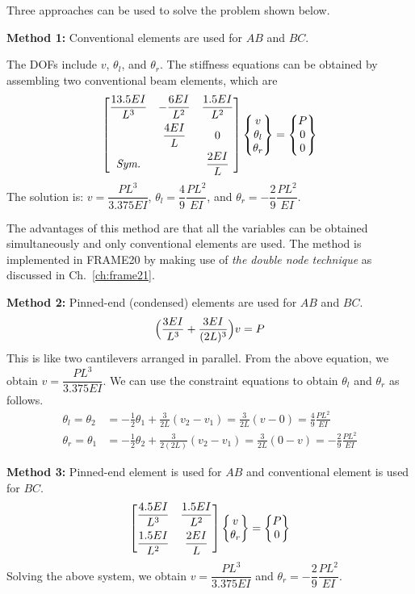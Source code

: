 \begin{example}
Three approaches can be used to solve the problem shown below.
\begin{fig}
  
\end{fig}
\textbf{Method 1:} Conventional elements are used for $AB$ and $BC$.

The DOFs include $v$, $\theta_l$, and $\theta_r$. The stiffness equations can be obtained by assembling two conventional beam elements, which are
\begin{equation*}
  \begin{bmatrix}
    \dfrac{13.5EI}{L^3} & -\dfrac{6EI}{L^2} & \dfrac{1.5EI}{L^2}\\[8pt]
    & \dfrac{4EI}{L} & 0\\[8pt]
    \textit{Sym.} & & \dfrac{2EI}{L}
  \end{bmatrix}\begin{Bmatrix}v\\ \theta_l\\ \theta_r\end{Bmatrix} = \begin{Bmatrix}P\\ 0\\ 0\end{Bmatrix}
\end{equation*}
The solution is: $v = \dfrac{PL^3}{3.375EI}$, $\theta_l = \dfrac49\dfrac{PL^2}{EI}$, and $\theta_r = -\dfrac29\dfrac{PL^2}{EI}$.

The advantages of this method are that all the variables can be obtained simultaneously and only conventional elements are used. The method is implemented in FRAME20 by making use of \emph{the double node technique} as discussed in Ch.~\ref{ch:frame21}.

\textbf{Method 2:} Pinned-end (condensed) elements are used for $AB$ and $BC$.
\begin{equation*}
  \Bigl(\frac{3EI}{L^3} + \frac{3EI}{(2L)^3}\Bigr)v = P
\end{equation*}
This is like two cantilevers arranged in parallel. From the above equation, we obtain $v = \dfrac{PL^3}{3.375EI}$. We can use the constraint equations to obtain $\theta_l$ and $\theta_r$ as follows.
\begin{align*}
  \theta_l = \theta_2 &= -\frac12\theta_1 + \frac{3}{2L}(v_2 - v_1) = \frac{3}{2L}(v - 0) = \frac49\frac{PL^2}{EI}\\
  \theta_r = \theta_1 &= -\frac12\theta_2 + \frac{3}{2(2L)}(v_2 - v_1) = \frac{3}{2L}(0 - v) = -\frac29\frac{PL^2}{EI}
\end{align*}

\textbf{Method 3:} Pinned-end element is used for $AB$ and conventional element is used for $BC$.
\begin{equation*}
  \begin{bmatrix}\dfrac{4.5EI}{L^3} & \dfrac{1.5EI}{L^2}\\[8pt] \dfrac{1.5EI}{L^2} & \dfrac{2EI}{L}\end{bmatrix}\begin{Bmatrix}v\\ \theta_r\end{Bmatrix} = \begin{Bmatrix}P\\ 0\end{Bmatrix}
\end{equation*}
Solving the above system, we obtain $v = \dfrac{PL^3}{3.375EI}$ and $\theta_r = -\dfrac29\dfrac{PL^2}{EI}$.


\end{example}
